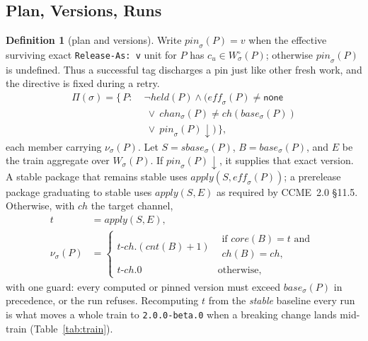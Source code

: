 \documentclass[10pt,conference]{IEEEtran}
\theoremstyle{definition}
\newtheorem{definition}{Definition}
\newcommand{\code}[1]{\texttt{#1}}
\begin{document}
\subsection{Plan, Versions, Runs}

\begin{definition}[plan and versions]
\label{def:plan}
Write $\mathit{pin}_\sigma(P)=v$ when the effective surviving exact
\code{Release-As: v} unit for $P$ has $c_u\in W^\circ_\sigma(P)$; otherwise
$\mathit{pin}_\sigma(P)$ is undefined. Thus a successful tag discharges a
pin just like other fresh work, and the directive is fixed during a retry.
\begin{equation}
\begin{aligned}
  \Pi(\sigma) = \{\, P :\;
    &\lnot\mathit{held}(P) \wedge (\mathit{eff}_\sigma(P) \neq
     \mathsf{none} \\
    &\ \lor\ \mathit{chan}_\sigma(P) \neq
     \mathit{ch}(\mathit{base}_\sigma(P))
     \\
    &\ \lor\ \mathit{pin}_\sigma(P)\downarrow) \,\},
\end{aligned}
\end{equation}
each member carrying $\nu_\sigma(P)$. Let $S=\mathit{sbase}_\sigma(P)$,
$B=\mathit{base}_\sigma(P)$, and $E$ be the train aggregate over $W_\sigma(P)$.
If $\mathit{pin}_\sigma(P)\downarrow$, it supplies that exact version. A stable package that
remains stable uses $\mathit{apply}(S,\mathit{eff}_\sigma(P))$; a prerelease
package graduating to stable uses $\mathit{apply}(S,E)$ as required by
CCME~2.0 \S11.5. Otherwise, with $\mathit{ch}$ the target channel,
\begin{equation}
\label{eq:train}
\begin{aligned}
  t &= \mathit{apply}(S, E), \\
  \nu_\sigma(P) &=
  \begin{cases}
    t\text{-}\mathit{ch}.(\mathit{cnt}(B){+}1)
      & \begin{array}{l}\text{if } \mathit{core}(B) = t\text{ and}\\
        \mathit{ch}(B) = \mathit{ch},\end{array}\\
    t\text{-}\mathit{ch}.0 & \text{otherwise,}
  \end{cases}
\end{aligned}
\end{equation}
with one guard: every computed or pinned version must exceed
$\mathit{base}_\sigma(P)$ in precedence, or the run refuses. Recomputing
$t$ from the \emph{stable} baseline every run is what moves a whole
train to \code{2.0.0-beta.0} when a breaking change lands mid-train
(Table~\ref{tab:train}).

\end{definition}
\end{document}

